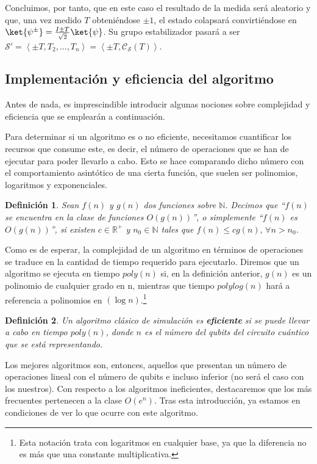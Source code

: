 \documentclass[11pt,a4paper,twoside,pdf]{article}
\numberwithin{equation}{section}
\newtheorem{definition}{Definición}
\begin{document}
			Concluimos, por tanto, que en este caso el resultado de la medida será aleatorio y que, una vez medido $T$ obteniéndose $\pm1$, el estado colapsará convirtiéndose en $\ket{\psi^{\pm}}=\frac{I\pm T}{\sqrt{2}}\ket{\psi}$. Su grupo estabilizador pasará a ser $\mathcal{S}' = \left\langle \pm T, T_2,...,T_n \right\rangle = \left\langle \pm T, \mathcal{C}_\mathcal{S}(T) \right\rangle  $.
		
	\subsection{Implementación y eficiencia del algoritmo} \label{subsec: eficiencia GottesmanKnill}
	
	Antes de nada, es imprescindible introducir algunas nociones sobre complejidad y eficiencia que se emplearán a continuación.
	
	Para determinar si un algoritmo es o no eficiente, necesitamos cuantificar los recursos que consume este, es decir, el número de operaciones que se han de ejecutar para poder llevarlo a cabo. Esto se hace comparando dicho número con el comportamiento asintótico de una cierta función, que suelen ser polinomios, logaritmos y exponenciales.
	
	 \begin{definition}
	 	Sean $f(n)$ y $g(n)$ dos funciones sobre $\mathbb{N}$. Decimos que ``$f(n)$ se encuentra en la clase de funciones $O(g(n))$'', o simplemente ``$f(n)$ es $O(g(n))$'', si existen $c\in\mathbb{R}^+$ y $n_0\in\mathbb{N}$ tales que $f(n)\leq cg(n), \, \forall n > n_0$.
	 \end{definition}
	
	Como es de esperar, la complejidad de un algoritmo en términos de operaciones se traduce en la cantidad de tiempo requerido para ejecutarlo. Diremos que un algoritmo se ejecuta en tiempo $poly(n)$ si, en la definición anterior, $g(n)$ es un polinomio de cualquier grado en n, mientras que tiempo $polylog(n)$ hará a referencia a polinomios en $(\log n)$.\footnote{Esta notación trata con logaritmos en cualquier base, ya que la diferencia no es más que una constante multiplicativa.}
	
	\begin{definition}
		Un algoritmo clásico de simulación es \textbf{eficiente} si se puede llevar a cabo en tiempo $poly(n)$, donde $n$ es el número del qubits del circuito cuántico que se está representando.
	\end{definition}

	Los mejores algoritmos son, entonces, aquellos que presentan un número de operaciones lineal con el número de qubits e incluso inferior (no será el caso con los nuestros). Con respecto a los algoritmos ineficientes, destacaremos que los más frecuentes pertenecen a la clase $O(e^n)$. Tras esta introducción, ya estamos en condiciones de ver lo que ocurre con este algoritmo.
 	
\end{document}

